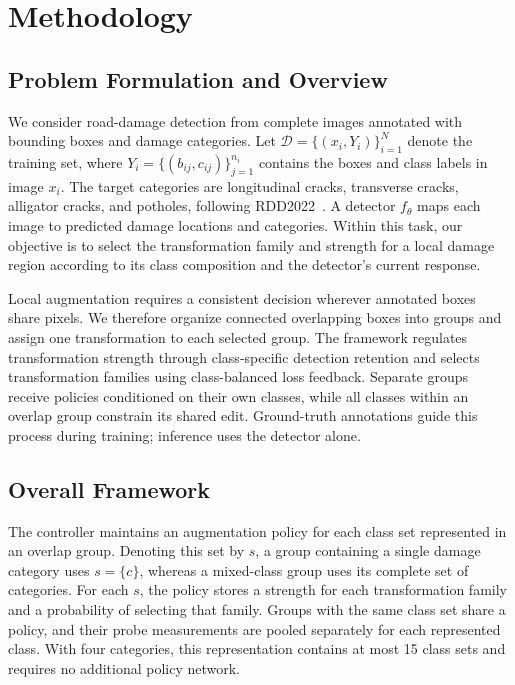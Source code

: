 \documentclass[conference]{IEEEtran}
\begin{document}
\section{Methodology}
\label{sec:method}

\subsection{Problem Formulation and Overview}
\label{sec:method_problem}

We consider road-damage detection from complete images annotated with bounding boxes and damage categories. Let $\mathcal{D}=\{(x_i,Y_i)\}_{i=1}^{N}$ denote the training set, where $Y_i=\{(b_{ij},c_{ij})\}_{j=1}^{n_i}$ contains the boxes and class labels in image $x_i$. The target categories are longitudinal cracks, transverse cracks, alligator cracks, and potholes, following RDD2022~\cite{arya2024rdd}. A detector $f_\theta$ maps each image to predicted damage locations and categories. Within this task, our objective is to select the transformation family and strength for a local damage region according to its class composition and the detector's current response.

Local augmentation requires a consistent decision wherever annotated boxes share pixels. We therefore organize connected overlapping boxes into groups and assign one transformation to each selected group. The framework regulates transformation strength through class-specific detection retention and selects transformation families using class-balanced loss feedback. Separate groups receive policies conditioned on their own classes, while all classes within an overlap group constrain its shared edit. Ground-truth annotations guide this process during training; inference uses the detector alone.

\subsection{Overall Framework}
\label{sec:method_framework}

The controller maintains an augmentation policy for each class set represented in an overlap group. Denoting this set by $s$, a group containing a single damage category uses $s=\{c\}$, whereas a mixed-class group uses its complete set of categories. For each $s$, the policy stores a strength for each transformation family and a probability of selecting that family. Groups with the same class set share a policy, and their probe measurements are pooled separately for each represented class. With four categories, this representation contains at most 15 class sets and requires no additional policy network.
\end{document}

